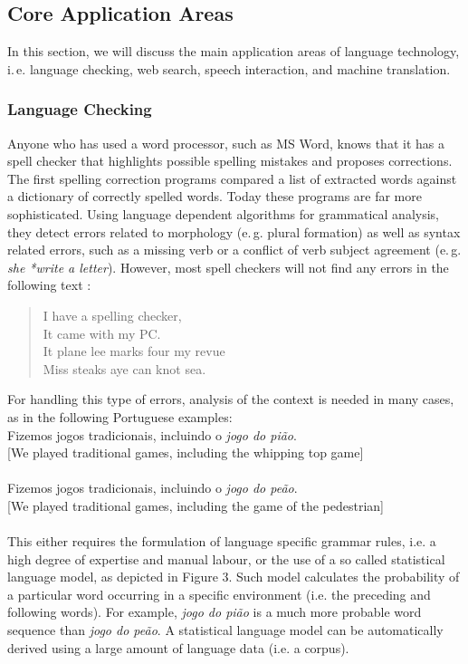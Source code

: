 \begin{multicols}{2}
\subsection{Core Application Areas}

In this section, we will discuss the main application areas of language technology, i.\,e. language checking, web search, speech interaction, and machine translation. 


\subsubsection{Language Checking}

Anyone who has used a word processor, such as MS Word, knows that it has a spell checker that highlights possible spelling mistakes and proposes corrections. The first spelling correction programs compared a list of extracted words against a dictionary of correctly spelled words. Today these programs are far more sophisticated. Using language dependent algorithms for grammatical analysis, they detect errors related to morphology (e.\,g. plural formation) as well as syntax related errors, such as a missing verb or a conflict of verb subject agreement (e.\,g. \textit{she *write a letter}). However, most spell checkers will not find any errors in the following text  \cite{zar1}:

\begin{quote}
  I have a spelling checker,\\
  It came with my PC.\\
  It plane lee marks four my revue\\
  Miss steaks aye can knot sea.
\end{quote}

 For handling this type of errors, analysis of the context is needed in many cases, as in the following Portuguese examples:\\

Fizemos jogos tradicionais, incluindo o \textit{jogo do pião}.\\
{[}We played traditional games, including the whipping top game{]}\\
\\
Fizemos jogos tradicionais, incluindo o \textit{jogo do peão}.\\
{[}We played traditional games, including the game of the pedestrian{]}\\
\\
This either requires the formulation of language specific grammar rules, i.e. a high degree of expertise and manual labour, or the use of a so called statistical language model, as depicted in Figure 3. Such model calculates the probability of a particular word occurring in a specific environment (i.e. the preceding and following words). For example, \textit{jogo do pião} is a much more probable word sequence than \textit{jogo do peão}. A statistical language model can be automatically derived using a large amount of language data (i.e. a corpus).


\end{multicols}
